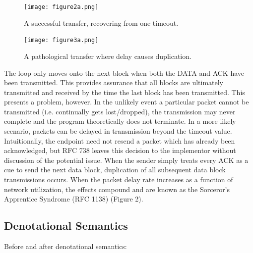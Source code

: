 \documentclass[a0,landscape]{a0poster}
\begin{document}
\begin{multicols}{4}
\begin{minipage}{\linewidth}
\centering
  \begin{minipage}{0.45\linewidth}
    \centering
    \begin{figure}[H]
    \centering
      \texttt{[image: figure2a.png]}
      \caption{A successful transfer, recovering from one timeout.}
    \end{figure}
  \end{minipage}
  \begin{minipage}{0.45\linewidth}
    \centering
    \begin{figure}[H]
    \centering
      \texttt{[image: figure3a.png]}
      \caption{A pathological transfer where delay causes duplication.}
    \end{figure}
  \end{minipage}
\end{minipage}

The loop only moves onto the next block when both the DATA and ACK have been transmitted. This provides assurance that all blocks are ultimately transmitted and received by the time the last block has been transmitted. This presents a problem, however. In the unlikely event a particular packet cannot be transmitted (i.e. continually gets lost/dropped), the transmission may never complete and the program theoretically does not terminate. In a more likely scenario, packets can be delayed in transmission beyond the timeout value. Intuitionally, the endpoint need not resend a packet which has already been acknowledged, but RFC 738 leaves this decision to the implementor without discussion of the potential issue. When the sender simply treats every ACK as a cue to send the next data block, duplication of all subsequent data block transmissions occurs. When the packet delay rate increases as a function of network utilization, the effects compound and are known as the Sorceror's Apprentice Syndrome (RFC 1138) (Figure 2).


\subsection*{Denotational Semantics}

Before and after denotational semantics:


\end{multicols}
\end{document}
